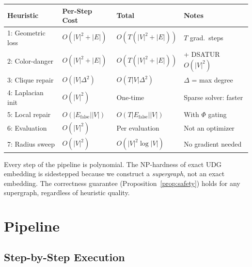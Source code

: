 \documentclass[11pt]{article}
\newcommand{\Efalse}{E_{\mathrm{false}}}
\begin{document}
\begin{center}
\begin{tabular}{@{}llll@{}}
\toprule
Heuristic & Per-Step Cost & Total & Notes \\
\midrule
1: Geometric loss & $O(|V|^2 + |E|)$ & $O(T(|V|^2+|E|))$ & $T$ grad.\ steps \\
2: Color-danger & $O(|V|^2 + |E|)$ & $O(T(|V|^2+|E|))$ & + DSATUR $O(|V|^2)$ \\
3: Clique repair & $O(|V|\Delta^2)$ & $O(T|V|\Delta^2)$ & $\Delta$ = max degree \\
4: Laplacian init & $O(|V|^2)$ & One-time & Sparse solver: faster \\
5: Local repair & $O(|\Efalse||V|)$ & $O(T|\Efalse||V|)$ & With $\Phi$ gating \\
6: Evaluation & $O(|V|^2)$ & Per evaluation & Not an optimizer \\
7: Radius sweep & $O(|V|^2)$ & $O(|V|^2\log|V|)$ & No gradient needed \\
\bottomrule
\end{tabular}
\end{center}

Every step of the pipeline is polynomial. The NP-hardness of exact UDG
embedding is sidestepped because we construct a \emph{supergraph}, not an
exact embedding. The correctness guarantee (Proposition~\ref{prop:safety})
holds for any supergraph, regardless of heuristic quality.

\newpage

\section{Pipeline}

\subsection{Step-by-Step Execution}
\end{document}
